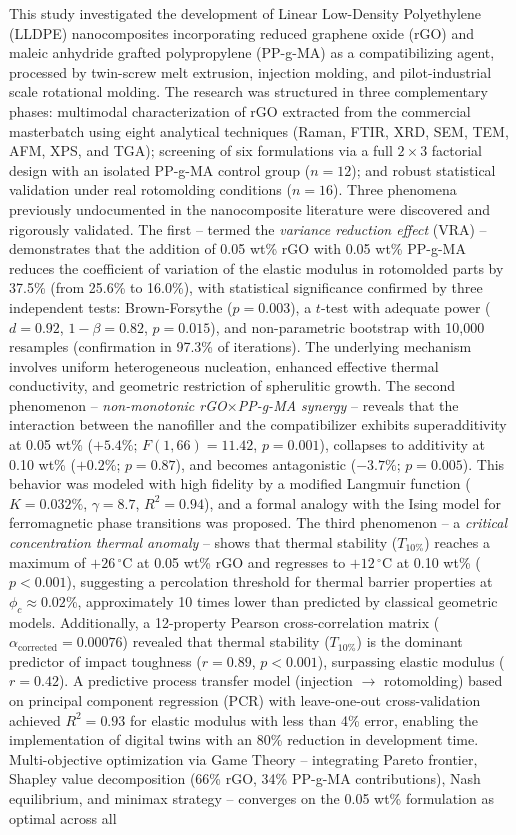 \documentclass[11pt,a4paper,oneside]{article}
\begin{document}
This study investigated the development of Linear Low-Density Polyethylene (LLDPE) nanocomposites incorporating reduced graphene oxide (rGO) and maleic anhydride grafted polypropylene (PP-g-MA) as a compatibilizing agent, processed by twin-screw melt extrusion, injection molding, and pilot-industrial scale rotational molding. The research was structured in three complementary phases: multimodal characterization of rGO extracted from the commercial masterbatch using eight analytical techniques (Raman, FTIR, XRD, SEM, TEM, AFM, XPS, and TGA); screening of six formulations via a full $2{\times}3$ factorial design with an isolated PP-g-MA control group ($n{=}12$); and robust statistical validation under real rotomolding conditions ($n{=}16$). Three phenomena previously undocumented in the nanocomposite literature were discovered and rigorously validated. The first -- termed the \textit{variance reduction effect} (VRA) -- demonstrates that the addition of 0.05 wt\% rGO with 0.05 wt\% PP-g-MA reduces the coefficient of variation of the elastic modulus in rotomolded parts by 37.5\% (from 25.6\% to 16.0\%), with statistical significance confirmed by three independent tests: Brown-Forsythe ($p{=}0.003$), a $t$-test with adequate power ($d{=}0.92$, $1{-}\beta{=}0.82$, $p{=}0.015$), and non-parametric bootstrap with 10,000 resamples (confirmation in 97.3\% of iterations). The underlying mechanism involves uniform heterogeneous nucleation, enhanced effective thermal conductivity, and geometric restriction of spherulitic growth. The second phenomenon -- \textit{non-monotonic rGO$\times$PP-g-MA synergy} -- reveals that the interaction between the nanofiller and the compatibilizer exhibits superadditivity at 0.05 wt\% ($+5.4\%$; $F(1{,}66){=}11.42$, $p{=}0.001$), collapses to additivity at 0.10 wt\% ($+0.2\%$; $p{=}0.87$), and becomes antagonistic ($-3.7\%$; $p{=}0.005$). This behavior was modeled with high fidelity by a modified Langmuir function ($K{=}0.032\%$, $\gamma{=}8.7$, $R^2{=}0.94$), and a formal analogy with the Ising model for ferromagnetic phase transitions was proposed. The third phenomenon -- a \textit{critical concentration thermal anomaly} -- shows that thermal stability ($T_{10\%}$) reaches a maximum of $+26\,^{\circ}$C at 0.05 wt\% rGO and regresses to $+12\,^{\circ}$C at 0.10 wt\% ($p{<}0.001$), suggesting a percolation threshold for thermal barrier properties at $\phi_c{\approx}0.02\%$, approximately 10 times lower than predicted by classical geometric models. Additionally, a 12-property Pearson cross-correlation matrix ($\alpha_{\text{corrected}}{=}0.00076$) revealed that thermal stability ($T_{10\%}$) is the dominant predictor of impact toughness ($r{=}0.89$, $p{<}0.001$), surpassing elastic modulus ($r{=}0.42$). A predictive process transfer model (injection $\rightarrow$ rotomolding) based on principal component regression (PCR) with leave-one-out cross-validation achieved $R^2{=}0.93$ for elastic modulus with less than 4\% error, enabling the implementation of digital twins with an 80\% reduction in development time. Multi-objective optimization via Game Theory -- integrating Pareto frontier, Shapley value decomposition (66\% rGO, 34\% PP-g-MA contributions), Nash equilibrium, and minimax strategy -- converges on the 0.05 wt\% formulation as optimal across all 
\end{document}

